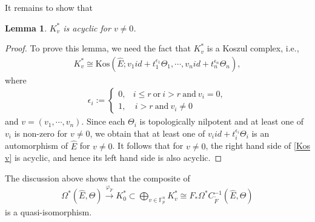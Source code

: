 \documentclass[12pt, a4paper]{article}
\newtheorem{lemma}{Lemma}[section]
\begin{document}
It remains to show that 
\begin{lemma}
$K_v^*$ is acyclic for $v\neq0$. 
\end{lemma}
\begin{proof}
To prove this lemma, we need the fact that $K_v^*$ is a Koszul complex, i.e., 
\begin{eqnarray}\label{Kos v}
K_v^*\cong\mathrm{Kos}(\hat E;v_1id+t_1^{\epsilon_1}\Theta_1,\cdots,v_nid+t_n^{\epsilon_n}\Theta_n),
\end{eqnarray}
where
\begin{eqnarray}\label{epsilon_i}
\epsilon_i:=\left\{
\begin{matrix}
 0,&i\leq r~\mathrm{or}~i>r~\mathrm{and}~v_i=0,\\
 1,&~i>r~\mathrm{and}~v_i\neq 0
\end{matrix}
\right.
\end{eqnarray}
and $v=(v_1,\cdots,v_n)$. Since each $\Theta_i$ is topologically nilpotent and at least one of $v_i$ is non-zero for $v\neq0$, we obtain that at least one of $v_iid+t_i^{\epsilon_i}\Theta_i$ is an automorphism of $\hat E$ for $v\neq0$. It follows that for $v\neq0$,  the right hand side of \eqref{Kos v} is acyclic, and hence its left hand side is also acyclic.
\end{proof}
The discussion above shows that the composite of 
\begin{eqnarray}\label{varphi tilde F}
\Omega^*(\hat E,\Theta)\stackrel{\varphi_{\tilde F}}{\to}K_0^*\subset\bigoplus_{v\in\mathbb F_p^n}K_v^*\cong F_*\Omega^*C_{\tilde F}^{-1}(\hat E,\Theta)
\end{eqnarray}
is a quasi-isomorphism.
\end{document}

